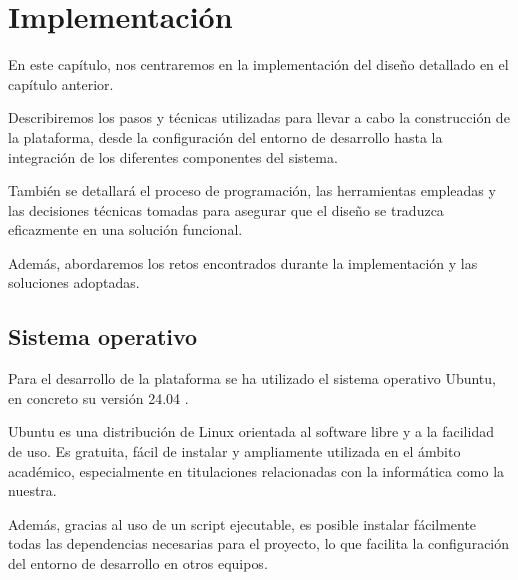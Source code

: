 \chapter{Implementación}

En este capítulo, nos centraremos en la implementación del diseño detallado en el capítulo anterior. 

Describiremos los pasos y técnicas utilizadas para llevar a cabo la construcción de la plataforma, desde la configuración del entorno de desarrollo hasta la integración de los diferentes componentes del sistema. 

También se detallará el proceso de programación, las herramientas empleadas y las decisiones técnicas tomadas para asegurar que el diseño se traduzca eficazmente en una solución funcional. 

Además, abordaremos los retos encontrados durante la implementación y las soluciones adoptadas.




\newpage

\section{Sistema operativo}

Para el desarrollo de la plataforma se ha utilizado el sistema operativo Ubuntu, en concreto su versión 24.04 \cite{petersen2025ubuntu}.

Ubuntu es una distribución de Linux orientada al software libre y a la facilidad de uso. Es gratuita, fácil de instalar y ampliamente utilizada en el ámbito académico, especialmente en titulaciones relacionadas con la informática como la nuestra.

Además, gracias al uso de un script ejecutable, es posible instalar fácilmente todas las dependencias necesarias para el proyecto, lo que facilita la configuración del entorno de desarrollo en otros equipos.

